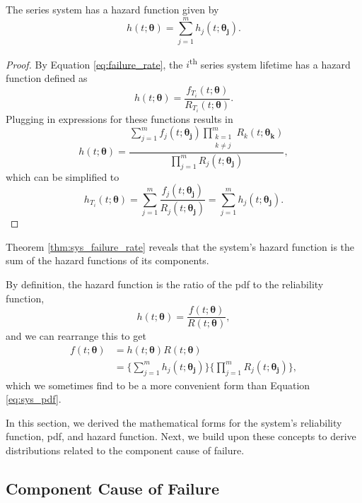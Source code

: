 \documentclass[
]{article}
\begin{document}
\begin{theorem}
\label{thm:sys_failure_rate}
The series system has a hazard function given by
\begin{equation}
\label{eq:sys_failure_rate}
  h(t;\boldsymbol{\theta}) = \sum_{j=1}^m h_j(t;\boldsymbol{\theta_j}).
\end{equation}
\end{theorem}
\begin{proof}
By Equation \eqref{eq:failure_rate}, the $i$\textsuperscript{th} series system lifetime has a hazard function defined as
$$
  h(t;\boldsymbol{\theta}) = \frac{f_{T_i}(t;\boldsymbol{\theta})}{R_{T_i}(t;\boldsymbol{\theta})}.
$$
Plugging in expressions for these functions results in
$$
  h(t;\boldsymbol{\theta}) = \frac{\sum_{j=1}^m f_j(t;\boldsymbol{\theta_j})
    \prod_{\substack{k=1\\k \neq j}}^m R_k(t;\boldsymbol{\theta_k})}
      {\prod_{j=1}^m R_j(t;\boldsymbol{\theta_j})},
$$
which can be simplified to
$$
h_{T_i}(t;\boldsymbol{\theta}) = \sum_{j=1}^m \frac{f_j(t;\boldsymbol{\theta_j})}{R_j(t;\boldsymbol{\theta_j})} = \sum_{j=1}^m h_j(t;\boldsymbol{\theta_j}).
$$
\end{proof}

Theorem \ref{thm:sys_failure_rate} reveals that the system's hazard
function is the sum of the hazard functions of its components.

By definition, the hazard function is the ratio of the pdf to the
reliability function, \[
h(t;\boldsymbol{\theta}) = \frac{f(t;\boldsymbol{\theta})}{R(t;\boldsymbol{\theta})},
\] and we can rearrange this to get \begin{equation}
\label{eq:sys_pdf_2}
\begin{split}
f(t;\boldsymbol{\theta}) &= h(t;\boldsymbol{\theta}) R(t;\boldsymbol{\theta})\\
              &= \biggl\{\sum_{j=1}^m h_j(t;\boldsymbol{\theta_j})\biggr\}
                 \biggl\{ \prod_{j=1}^m R_j(t;\boldsymbol{\theta_j}) \biggr\},
\end{split}
\end{equation} which we sometimes find to be a more convenient form than
Equation \eqref{eq:sys_pdf}.

In this section, we derived the mathematical forms for the system's
reliability function, pdf, and hazard function. Next, we build upon
these concepts to derive distributions related to the component cause of
failure.

\hypertarget{sec:comp_cause}{%
\subsection{Component Cause of Failure}\label{sec:comp_cause}}
\end{document}
